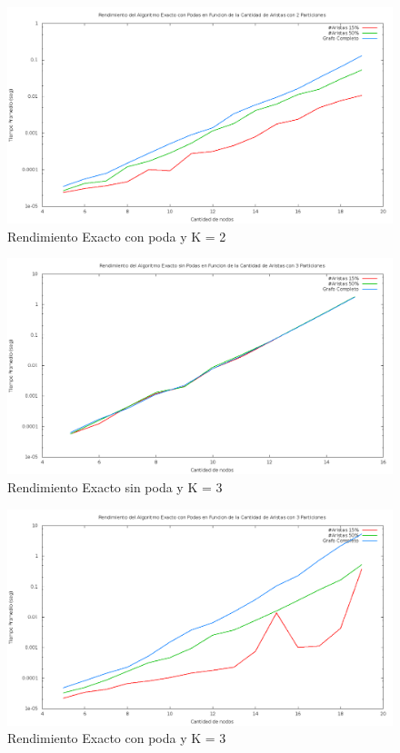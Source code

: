 \begin{figure}[H]
\begin{center}
\includegraphics[scale=0.3]{finales/rendimientoExactoConPoda2Particiones.png}
\caption{Rendimiento Exacto con poda y K = 2}
\end{center}
\end{figure}

\begin{figure}[H]
\begin{center}
\includegraphics[scale=0.3]{finales/rendimientoExactoSinPoda3Particiones.png}
\caption{Rendimiento Exacto sin poda y K = 3}
\end{center}
\end{figure}

\begin{figure}[H]
\begin{center}
\includegraphics[scale=0.3]{finales/rendimientoExactoConPoda3Particiones.png}
\caption{Rendimiento Exacto con poda y K = 3}
\end{center}
\end{figure}

